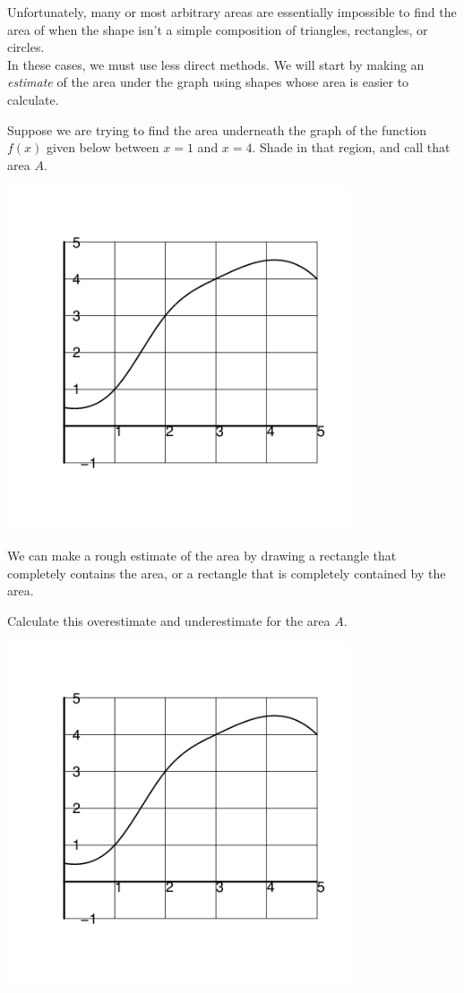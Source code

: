 Unfortunately, many or most arbitrary areas are essentially impossible
to find the area of when the shape isn't a simple composition of
triangles, rectangles, or circles. \\[1ex]

In these cases, we must use less direct methods.  We will start by
making an {\em estimate} of the area under the graph using shapes
whose area is easier to calculate.

\newpage

\problem Suppose we are trying to find the area underneath the graph of the
function $f(x)$ given below between $x = 1$ and $x=4$.  Shade in that
region, and call that area $A$.

\begin{center}
\includegraphics[width=4in]{graphics/notes_04_graph06}
\end{center}


\newpage
We can make a rough estimate of the area by drawing a rectangle that
completely contains the area, or a rectangle that is completely
contained by the area.


\problem 
{Calculate this overestimate and underestimate for the
  area $A$.}
  
\hfill \includegraphics[width=4in]{graphics/notes_04_graph06}


